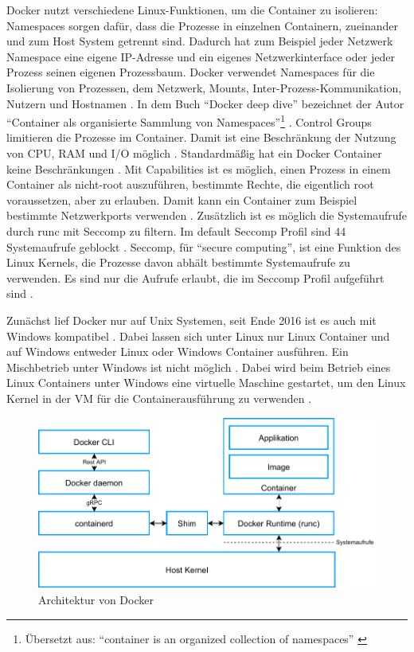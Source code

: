 Docker nutzt verschiedene Linux-Funktionen, um die Container zu isolieren: Namespaces sorgen dafür, dass die Prozesse in einzelnen Containern, zueinander und zum Host System getrennt sind. Dadurch hat zum Beispiel jeder Netzwerk Namespace eine eigene IP-Adresse und ein eigenes Netzwerkinterface oder jeder Prozess seinen eigenen Prozessbaum. Docker verwendet Namespaces für die Isolierung von Prozessen, dem Netzwerk, Mounts, Inter-Prozess-Kommunikation, Nutzern und Hostnamen \cite[vgl.][S. 171 f.]{Poulton.2017}. In dem Buch "`Docker deep dive"' bezeichnet der Autor "`Container als organisierte Sammlung von Namespaces"'\footnote{Übersetzt aus: "`container is an organized collection of namespaces"' \cite[][172]{Poulton.2017}} \cite[][172]{Poulton.2017}.
Control Groups limitieren die Prozesse im Container. Damit ist eine Beschränkung der Nutzung von CPU, RAM und I/O möglich \cite[vgl.][172]{Poulton.2017}. Standardmäßig hat ein Docker Container keine Beschränkungen \cite[vgl.][]{DockerInc.2020}.
Mit Capabilities ist es möglich, einen Prozess in einem Container als nicht-root auszuführen, bestimmte Rechte, die eigentlich root voraussetzen, aber zu erlauben. Damit kann ein Container zum Beispiel bestimmte Netzwerkports verwenden \cite[vgl.][173]{Poulton.2017}.
Zusätzlich ist es möglich die Systemaufrufe durch runc mit Seccomp zu filtern. Im default Seccomp Profil sind 44 Systemaufrufe geblockt \cite[vgl.][]{DockerInc..20191203}. Seccomp, für "`secure computing"', ist eine Funktion des Linux Kernels, die Prozesse davon abhält bestimmte Systemaufrufe zu verwenden. Es sind nur die Aufrufe erlaubt, die im Seccomp Profil aufgeführt sind \cite[][S. 12 f.]{Randal.28.04.2019}.

Zunächst lief Docker nur auf Unix Systemen, seit Ende 2016 ist es auch mit Windows kompatibel \cite[vgl.][11]{Jangla.2018}. Dabei lassen sich unter Linux nur Linux Container und auf Windows entweder Linux oder Windows Container ausführen. Ein Mischbetrieb unter Windows ist nicht möglich \cite[vgl.][]{cwilhit.2019}. Dabei wird beim Betrieb eines Linux Containers unter Windows eine virtuelle Maschine gestartet, um den Linux Kernel in der \ac{VM} für die Containerausführung zu verwenden \cite[vgl.][28]{Poulton.2017}.

\begin{figure} [ht]
	\centering
	\includegraphics[width=1\linewidth]{gfx/docker_arch.pdf}
	\caption{Architektur von Docker}
	\label{fig:docker}
\end{figure}

